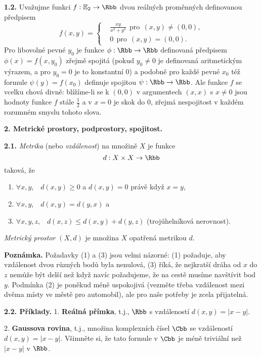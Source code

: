 \documentclass[12pt]{article}
\begin{document}
{{\bf 1.2.} Uvažujme funkci $f:\mathbb E_2\to \Rbb$ dvou reálných proměnných definovanou předpisem
$$
f(x,y)=\begin{cases} &\frac{xy}{x^2+y^2}\ \ \text{pro}\ \ (x,y)\neq(0,0),\\
&0\ \ \text{pro}\ \ (x,y)=(0,0).\end{cases}
$$
Pro libovolné pevné $y_0$ je funkce $\phi:\Rbb\to\Rbb$ definovaná předpisem $\phi(x)=f(x,y_0)$ zřejmě spojitá
(pokud $y_0\neq 0$ je definovaná aritmetickým výrazem, a pro $y_0=0$ je to konstantní 0) a podobně
pro každé pevné $x_0$ též formule $\psi(y)=f(x_0)$ definuje spojitou $\psi:\Rbb\to\Rbb$. Ale funkce $f$ se vcelku chová divně: blížíme-li se k $(0,0)$ v argumentech $(x,x)$ s $x\neq 0$ jsou  hodnoty funkce $f$ stále $\frac12$ a v $x=0$ je skok do 0, zřejmá nespojitost v každém rozumném smyslu tohoto slova.



 \vskip10mm
 
 {\large\bf 2. Metrické prostory, podprostory, spojitost.}
  
 \bigskip
 
 
 {\bf 2.1.} {\em Metrika} (nebo {\em  vzdálenost})  na množině $X$ je funkce
 $$
 d:X\times X\to\Rbb
 $$
 taková, že
 \begin{enumerate}
 \item $\forall x,y$,\ \  $d(x,y)\geq 0$ a $d(x,y)=0$ právě když $x=y$,
 \item $\forall x,y$,\ \ $d(x,y)=d(y,x)$ a
 \item $\forall x,y,z$,\ \ $d(x,z)\leq d(x,y)+d(y,z)$ (trojúhelníková nerovnost).
 \end{enumerate}
 
{\em Metrický prostor} $(X,d)$ je množina $X$ opatřená metrikou $d$.
 
 \medskip
 
 {\bf Poznámka.} Požadavky (1) a (3) jsou velmi názorné: (1) požaduje, aby vzdálenost dvou různých bodů byla nenulová, (3) říká, že nejkratší dráha od $x$ do $z$ nemůže být delší než když navíc požadujeme, že na cestě musíme navštívit bod $y$. Podmínka (2) je poněkud méně uspokojivá (vezměte třeba vzdálenost mezi dvěma místy ve městě pro automobil), ale pro naše potřeby je zcela přijatelná.
 
 \bigskip
 
 {\bf 2.2. Příklady.} 1. {\bf Reálná přímka}, t.j., $\Rbb$ s vzdáleností $d(x,y)=|x-y|$.
 
 \smallskip
 
 2. {\bf Gaussova  rovina}, t.j., množina komplexních čísel $\Cbb$ se vzdáleností $d(x,y)=|x-y|$. Všimněte
 si, že tato formule v $\Cbb$ je méně triviální než $|x-y|$ v $\Rbb$.
 
}
\end{document}

